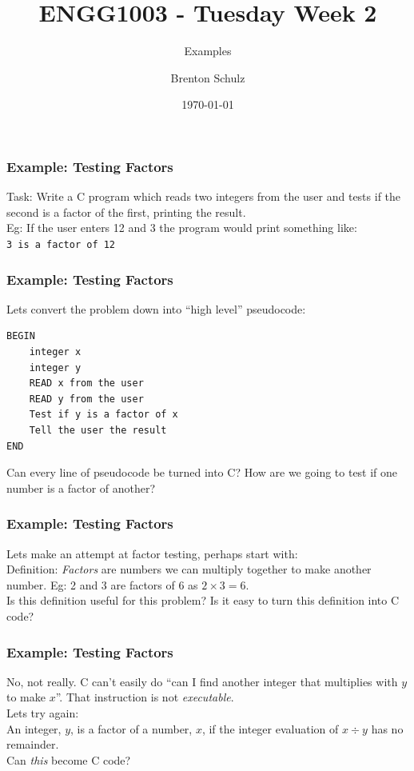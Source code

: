 \documentclass[14pt]{beamer}
\title{ENGG1003 - Tuesday Week 2}
\subtitle{Examples}
\author{Brenton Schulz}
\institute{University of Newcastle}
\date{\today}
\begin{document}
\titlepage

\begin{frame}
\frametitle{Example: Testing Factors}
Task: Write a C program which reads two integers from the user and tests if the second is a factor of the first, printing the result.\\
\vspace{5mm}
Eg: If the user enters 12 and 3 the program would print something like:\\
\texttt{3 is a factor of 12}
\end{frame}

\begin{frame}[fragile]
\frametitle{Example: Testing Factors}
Lets convert the problem down into ``high level'' pseudocode:
\begin{lstlisting}[style=pseudo]
BEGIN
	integer x
	integer y
	READ x from the user
	READ y from the user
	Test if y is a factor of x
	Tell the user the result
END
\end{lstlisting}
Can every line of pseudocode be turned into C? How are we going to test if one number is a factor of another?
\end{frame}

\begin{frame}
\frametitle{Example: Testing Factors}
Lets make an attempt at factor testing, perhaps start with:\\
\vspace{5mm}
Definition: \textit{Factors} are numbers we can multiply together to make another number. Eg: 2 and 3 are factors of 6 as $2 \times 3 = 6$.\\
\vspace{5mm}
Is this definition useful for this problem? Is it easy to turn this definition into C code?
\end{frame}

\begin{frame}
\frametitle{Example: Testing Factors}
No, not really. C can't easily do ``can I find another integer that multiplies with $y$ to make $x$''. That instruction is not \textit{executable}. \\
\vspace{5mm}
Lets try again: \\
\vspace{5mm}
An integer, $y$, is a factor of a number, $x$, if the integer evaluation of $x\div y$ has no remainder.\\
\vspace{5mm}
Can \textit{this} become C code?
\end{frame}
\end{document}
